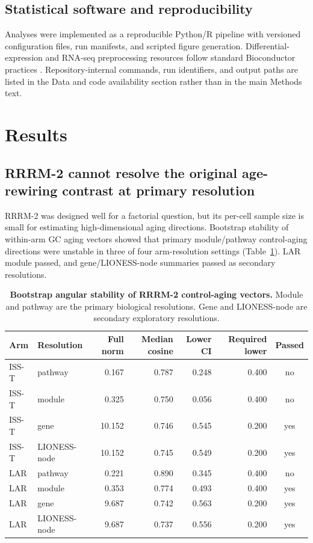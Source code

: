 \documentclass[11pt]{article}
\begin{document}
\subsection{Statistical software and reproducibility}

Analyses were implemented as a reproducible Python/R pipeline with versioned configuration files, run manifests, and scripted figure generation. Differential-expression and RNA-seq preprocessing resources follow standard Bioconductor practices \citep{ritchie2015limma,love2014deseq2,robinson2010edger}. Repository-internal commands, run identifiers, and output paths are listed in the Data and code availability section rather than in the main Methods text.

\section{Results}

\subsection{RRRM-2 cannot resolve the original age-rewiring contrast at primary resolution}

RRRM-2 was designed well for a factorial question, but its per-cell sample size is small for estimating high-dimensional aging directions. Bootstrap stability of within-arm GC aging vectors showed that primary module/pathway control-aging directions were unstable in three of four arm-resolution settings (Table~\ref{tab:stability}). LAR module passed, and gene/LIONESS-node summaries passed as secondary resolutions.

\begin{table}[H]
\centering\small
\begin{tabular}{llrrrrc}
\toprule
Arm & Resolution & Full norm & Median cosine & Lower CI & Required lower & Passed \\
\midrule
ISS-T & pathway & 0.167 & 0.787 & 0.248 & 0.400 & no \\
ISS-T & module & 0.325 & 0.750 & 0.056 & 0.400 & no \\
ISS-T & gene & 10.152 & 0.746 & 0.545 & 0.200 & yes \\
ISS-T & LIONESS-node & 10.152 & 0.745 & 0.549 & 0.200 & yes \\
LAR & pathway & 0.221 & 0.890 & 0.345 & 0.400 & no \\
LAR & module & 0.353 & 0.774 & 0.493 & 0.400 & yes \\
LAR & gene & 9.687 & 0.742 & 0.563 & 0.200 & yes \\
LAR & LIONESS-node & 9.687 & 0.737 & 0.556 & 0.200 & yes \\
\bottomrule
\end{tabular}
\caption{\textbf{Bootstrap angular stability of RRRM-2 control-aging vectors.} Module and pathway are the primary biological resolutions. Gene and LIONESS-node are secondary exploratory resolutions.}
\label{tab:stability}
\end{table}
\end{document}
